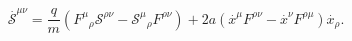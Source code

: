 \begin{equation}
\stackrel{.}{\mathcal{S}}^{\mu \nu }=\frac{q}{m}\left( F^{\mu }{}_{\rho }%
\mathcal{S}^{\rho \nu }-\mathcal{S}^{\mu }{}_{\rho }F^{\rho \nu }\right)
+2a\left( \stackrel{.}{x}^{\mu }F^{\rho \nu }{}-\stackrel{.}{x}^{\nu
}F^{\rho \mu }\right) \stackrel{.}{x}_{\rho }.
\end{equation}

